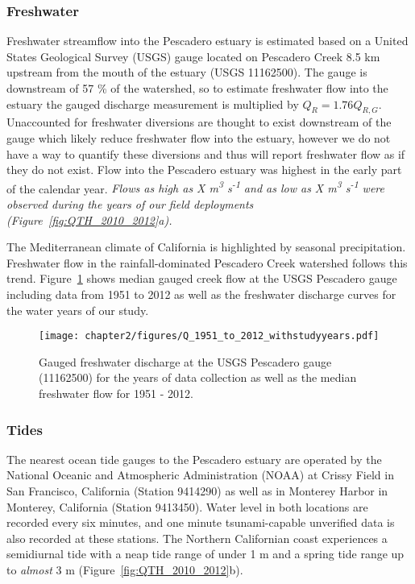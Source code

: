 \subsubsection{Freshwater}
Freshwater streamflow into the Pescadero estuary is estimated based on a United States Geological Survey (USGS) gauge located on Pescadero Creek 8.5 km upstream from the mouth of the estuary (USGS 11162500). The gauge is downstream of 57 \% of the watershed, so to estimate freshwater flow into the estuary the gauged discharge measurement is multiplied by $Q_R = 1.76Q_{R,G}$. Unaccounted for freshwater diversions are thought to exist downstream of
the gauge which likely reduce freshwater flow into the estuary, however we do not have a way to quantify these diversions and thus will report freshwater flow as if they do not exist. Flow into the Pescadero estuary was highest in the early part of the calendar year. \emph{Flows as high as X m\textsuperscript{3} s\textsuperscript{-1} and as low as X m\textsuperscript{3} s\textsuperscript{-1} were observed during the years of our field deployments (Figure~\ref{fig:QTH_2010_2012}a).} 

The Mediterranean climate of California is highlighted by seasonal precipitation. Freshwater flow in the rainfall-dominated Pescadero Creek watershed follows this trend. Figure~\ref{fig:Q_1951_2012} shows median gauged creek flow at the USGS Pescadero gauge including data from 1951 to 2012 as well as the freshwater discharge curves for the water years of our study. 


\begin{figure}
	\begin{center}
		\texttt{[image: chapter2/figures/Q\_1951\_to\_2012\_withstudyyears.pdf]} \caption{Gauged freshwater discharge at the USGS Pescadero gauge (11162500) for the years of data collection as well as the median freshwater flow for 1951 - 2012.}\label{fig:Q_1951_2012}
	\end{center}
\end{figure}


\subsubsection{Tides}
The nearest ocean tide gauges to the Pescadero estuary are operated by the National Oceanic and Atmospheric Administration (NOAA) at Crissy Field in San Francisco, California (Station 9414290) as well as in Monterey Harbor in Monterey, California (Station 9413450). Water level in both locations are recorded every six minutes, and one minute tsunami-capable unverified data is also recorded at these stations. The Northern Californian coast experiences a semidiurnal tide with a neap tide range of under 1 m and a spring tide range up to \emph{almost} 3 m (Figure~\ref{fig:QTH_2010_2012}b). 

